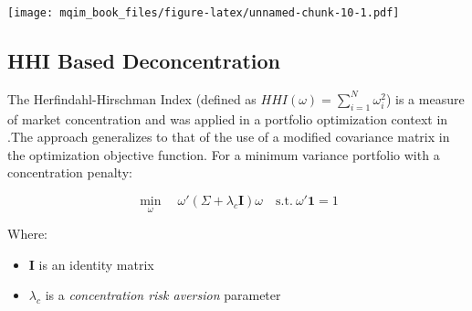 \documentclass[]{book}
\newenvironment{Shaded}{\begin{snugshade}}{\end{snugshade}}
\newcommand{\KeywordTok}[1]{\textcolor[rgb]{0.13,0.29,0.53}{\textbf{#1}}}
\newcommand{\DataTypeTok}[1]{\textcolor[rgb]{0.13,0.29,0.53}{#1}}
\newcommand{\DecValTok}[1]{\textcolor[rgb]{0.00,0.00,0.81}{#1}}
\newcommand{\StringTok}[1]{\textcolor[rgb]{0.31,0.60,0.02}{#1}}
\newcommand{\OperatorTok}[1]{\textcolor[rgb]{0.81,0.36,0.00}{\textbf{#1}}}
\newcommand{\NormalTok}[1]{#1}
\providecommand{\tightlist}{%
  \setlength{\itemsep}{0pt}\setlength{\parskip}{0pt}}
\theoremstyle{definition}
\theoremstyle{definition}
\theoremstyle{definition}
\theoremstyle{remark}
\begin{document}
\begin{Shaded}
\end{Shaded}

\texttt{[image: mqim\_book\_files/figure-latex/unnamed-chunk-10-1.pdf]}

\subsection{HHI Based Deconcentration}\label{hhi-based-deconcentration}

The Herfindahl-Hirschman Index (defined as
\(HHI(\omega) = \sum_{i=1}^N \omega_i^2\)) is a measure of market
concentration and was applied in a portfolio optimization context in
\citep{king2007}.The approach generalizes to that of the use of a
modified covariance matrix in the optimization objective function. For a
minimum variance portfolio with a concentration penalty:

\[
\min_\omega \quad \omega' (\Sigma + \lambda_{c} \mathbf{I}) \omega \quad \text{s.t.} \ \omega' \mathbf{1} = 1
\]

Where:

\begin{itemize}
\tightlist
\item
  \(\mathbf{I}\) is an identity matrix
\item
  \(\lambda_c\) is a \emph{concentration risk aversion} parameter
\end{itemize}
\end{document}
